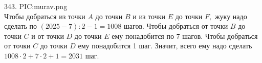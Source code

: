 343. {{PIC:murav.png}}\\
Чтобы добраться из точки $A$ до точки $B$ и из точки $E$ до точки $F,$ жуку надо сделать по $(2025-7):2-1=1008$ шагов. Чтобы добраться от точки $B$ до точки $C$ и от точки $D$ до точки $E$ ему понадобится по 7 шагов. Чтобы добраться от точки $C$ до точки $D$ ему понадобится 1 шаг. Значит, всего ему надо сделать $1008\cdot2+7\cdot2+1=2031$ шаг.\\
